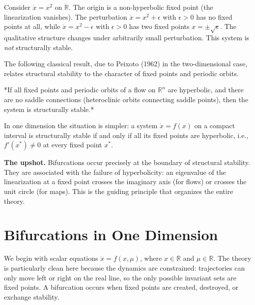 \begin{example}
Consider $\dot{x} = x^2$ on $\mathbb{R}$. The origin is a non-hyperbolic fixed point (the linearization vanishes). The perturbation $\dot{x} = x^2 + \epsilon$ with $\epsilon > 0$ has no fixed points at all, while $\dot{x} = x^2 - \epsilon$ with $\epsilon > 0$ has two fixed points $x = \pm\sqrt{\epsilon}$. The qualitative structure changes under arbitrarily small perturbation. This system is \textit{not} structurally stable.

The following classical result, due to Peixoto (1962) in the two-dimensional case, relates structural stability to the character of fixed points and periodic orbits.
\end{example}


\begin{theorem}\label{thm:5.1}
*If all fixed points and periodic orbits of a flow on $\mathbb{R}^n$ are hyperbolic, and there are no saddle connections (heteroclinic orbits connecting saddle points), then the system is structurally stable.*

In one dimension the situation is simpler: a system $\dot{x} = f(x)$ on a compact interval is structurally stable if and only if all its fixed points are hyperbolic, i.e., $f'(x^*) \neq 0$ at every fixed point $x^*$.

\textbf{The upshot.} Bifurcations occur precisely at the boundary of structural stability. They are associated with the failure of hyperbolicity: an eigenvalue of the linearization at a fixed point crosses the imaginary axis (for flows) or crosses the unit circle (for maps). This is the guiding principle that organizes the entire theory.


\bigskip

\end{theorem}


\section{Bifurcations in One Dimension}\label{sec:5.2}

We begin with scalar equations $\dot{x} = f(x, \mu)$, where $x \in \mathbb{R}$ and $\mu \in \mathbb{R}$. The theory is particularly clean here because the dynamics are constrained: trajectories can only move left or right on the real line, so the only possible invariant sets are fixed points. A bifurcation occurs when fixed points are created, destroyed, or exchange stability.

